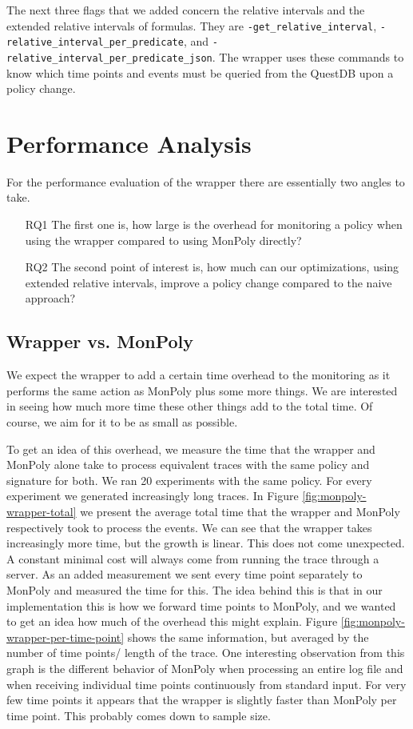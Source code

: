 The next three flags that we added concern the relative intervals and the extended relative intervals of formulas.
They are \texttt{-get\_relative\_interval}, \texttt{-relative\_interval\_per\_predicate}, and \texttt{-relative\_interval\_per\_predicate\_json}.
The wrapper uses these commands to know which time points and events must be queried from the QuestDB upon a policy change.

\section{Performance Analysis}
For the performance evaluation of the wrapper there are essentially two angles to take.
\begin{enumerate}
    \item[RQ1]
        The first one is, how large is the overhead for monitoring a policy when using the wrapper compared to using MonPoly directly?
    \item[RQ2]
        The second point of interest is, how much can our optimizations, using extended relative intervals, improve a policy change compared to the naive approach?
\end{enumerate}

\subsection{Wrapper vs. MonPoly}
We expect the wrapper to add a certain time overhead to the monitoring as it performs the same action as MonPoly plus some more things.
We are interested in seeing how much more time these other things add to the total time.
Of course, we aim for it to be as small as possible.

To get an idea of this overhead, we measure the time that the wrapper and MonPoly alone take to process equivalent traces with the same policy and signature for both.
We ran 20 experiments with the same policy.
For every experiment we generated increasingly long traces.
In Figure \ref{fig:monpoly-wrapper-total} we present the average total time that the wrapper and MonPoly respectively took to process the events.
We can see that the wrapper takes increasingly more time, but the growth is linear.
This does not come unexpected.
A constant minimal cost will always come from running the trace through a server.
As an added measurement we sent every time point separately to MonPoly and measured the time for this.
The idea behind this is that in our implementation this is how we forward time points to MonPoly, and we wanted to get an idea how much of the overhead this might explain.
Figure \ref{fig:monpoly-wrapper-per-time-point} shows the same information, but averaged by the number of time points/ length of the trace.
One interesting observation from this graph is the different behavior of MonPoly when processing an entire log file and when receiving individual time points continuously from standard input.
For very few time points it appears that the wrapper is slightly faster than MonPoly per time point.
This probably comes down to sample size.

